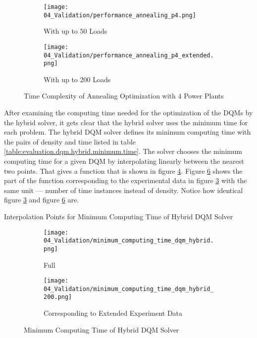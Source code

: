 \begin{figure}
  \begin{subfigure}[b]{0.5 \textwidth}
    \centering
    \texttt{[image: 04\_Validation/performance\_annealing\_p4.png]}
    \caption{With up to $50$ Loads}
    \label{figure:evaluation.annealing.performance}
  \end{subfigure}
  \begin{subfigure}[b]{0.5 \textwidth}
    \centering
    \texttt{[image: 04\_Validation/performance\_annealing\_p4\_extended.png]}
    \caption{With up to $200$ Loads}
    \label{figure:evaluation.annealing.performance.extended}
  \end{subfigure}
  \caption{Time Complexity of Annealing Optimization with $4$ Power Plants}
\end{figure}

After examining the computing time needed for the optimization of the DQMs by the hybrid solver, it gets clear that the hybrid solver uses the minimum time for each problem.
The hybrid DQM solver defines its minimum computing time with the pairs of density and time listed in table \ref{table:evaluation.dqm.hybrid.minimum.time}.
The solver chooses the minimum computing time for a given DQM by interpolating linearly between the nearest two points.
That gives a function that is shown in figure \ref{figure:evaluation.dqm.hybrid.minimum.time}.
Figure \ref{figure:evaluation.dqm.hybrid.minimum.time.200} shows the part of the function corresponding to the experimental data in figure \ref{figure:evaluation.annealing.performance.extended} with the same unit
--- number of time instances instead of density.
Notice how identical figure \ref{figure:evaluation.annealing.performance.extended} and figure \ref{figure:evaluation.dqm.hybrid.minimum.time.200} are.
\begin{table}[ht]
  \centering
  
  \caption{Interpolation Points for Minimum Computing Time of Hybrid DQM Solver}
  \label{table:evaluation.dqm.hybrid.minimum.time}
\end{table}
\begin{figure} [ht]
  \begin{subfigure}[b]{0.5 \textwidth}
    \centering
    \texttt{[image: 04\_Validation/minimum\_computing\_time\_dqm\_hybrid.png]}
    \caption{Full}
    \label{figure:evaluation.dqm.hybrid.minimum.time}
  \end{subfigure}
  \begin{subfigure}[b]{0.5 \textwidth}
    \centering
    \texttt{[image: 04\_Validation/minimum\_computing\_time\_dqm\_hybrid\_200.png]}
    \caption{Corresponding to Extended Experiment Data}
    \label{figure:evaluation.dqm.hybrid.minimum.time.200}
  \end{subfigure}
  \caption{Minimum Computing Time of Hybrid DQM Solver}
\end{figure}

